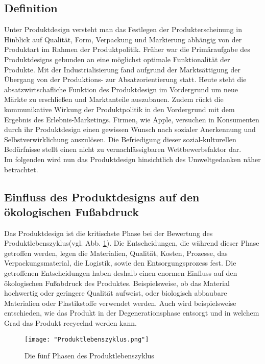 \documentclass[13pt,titlepage]{article}
\begin{document}
\subsection {Definition}
	Unter Produktdesign versteht man das Festlegen der Produkterscheinung in Hinblick auf Qualit\"at, Form, Verpackung und Markierung abh\"angig von der Produktart\protect\footnotemark{} im Rahmen der Produktpolitik. 
Früher war die Prim\"araufgabe des Produktdesigns gebunden an eine m\"oglichst optimale Funktionalit\"at der Produkte. 
Mit der Industrialisierung fand aufgrund der Markts\"attigung der \"Ubergang von der Produktions- zur Absatzorientierung statt.
Heute steht die absatzwirtschafliche Funktion des Produktdesign im Vordergrund um neue Märkte zu erschließen und Marktanteile auszubauen. 
Zudem rückt die kommunikative Wirkung der Produktpolitik in den Vordergrund mit dem Ergebnis des Erlebnis-Marketings. 
Firmen, wie Apple, versuchen in Konsumenten durch ihr Produktdesign einen gewissen Wunsch nach sozialer Anerkennung und Selbstverwirklichung auszul\"osen. 
Die Befriedigung dieser sozial-kulturellen Bed\"urfnisse stellt einen nicht zu vernachl\"assigbaren Wettbewerbsfaktor dar.\\

Im folgenden wird nun das Produktdesign hinsichtlich des Umweltgedanken n\"aher betrachtet.

\subsection {Einfluss des Produktdesigns auf den \"okologischen Fußabdruck}
	Das Produktdesign ist die kritischste Phase bei der Bewertung des Produktlebenszyklus(vgl. Abb. \ref{fig:Produktlebenszyklus}).
Die Entscheidungen, die w\"ahrend dieser Phase getroffen werden, legen die Materialien, Qualit\"at, Kosten, Prozesse, das Verpackungsmaterial, die Logistik, sowie den Entsorgungsprozess fest. 
Die getroffenen Entscheidungen haben deshalb einen enormen Einfluss auf den ökologischen Fußabdruck des Produktes. 
Beispielsweise, ob das Material hochwertig oder geringere Qualit\"at aufweist, oder biologisch abbaubare Materialien oder Plastikstoffe verwendet werden. 
Auch wird beispielsweise entschieden, wie das Produkt in der Degenerationsphase entsorgt und in welchem Grad das Produkt recycelnd werden kann. 
	\begin{figure}[h]
	 \centering
	 \texttt{[image: "Produktlebenszyklus.png"]}
	 \caption{Die fünf Phasen des Produktlebenszyklus\protect\footnotemark}
	 \label{fig:Produktlebenszyklus}
	\end{figure}
\end{document}
